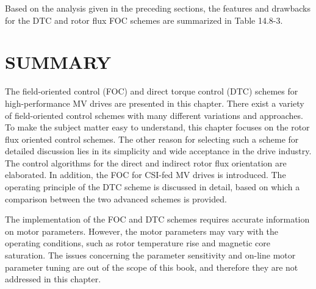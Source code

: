 \documentclass[letterpaper,12pt]{article}
\begin{document}
Based on the analysis given in the preceding sections, the features and drawbacks for the DTC and rotor flux FOC schemes are summarized in Table 14.8-3.

\clearpage
\section{SUMMARY}

The field-oriented control (FOC) and direct torque control (DTC) schemes for high-performance MV drives are presented in this chapter. There exist a variety of field-oriented control schemes with many different variations and approaches. To make the subject matter easy to understand, this chapter focuses on the rotor flux oriented control schemes. The other reason for selecting such a scheme for detailed discussion lies in its simplicity and wide acceptance in the drive industry. The control algorithms for the direct and indirect rotor flux orientation are elaborated. In addition, the FOC for CSI-fed MV drives is introduced. The operating principle of the DTC scheme is discussed in detail, based on which a comparison between the two advanced schemes is provided.

The implementation of the FOC and DTC schemes requires accurate information on motor parameters. However, the motor parameters may vary with the operating conditions, such as rotor temperature rise and magnetic core saturation. The issues concerning the parameter sensitivity and on-line motor parameter tuning are out of the scope of this book, and therefore they are not addressed in this chapter.
\end{document}
